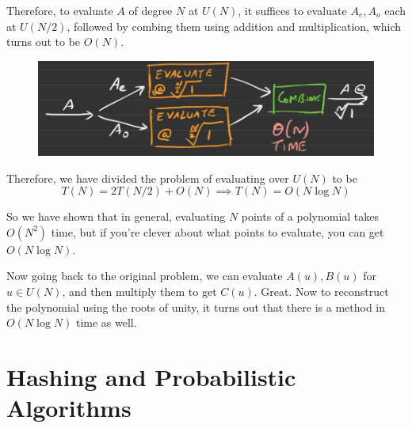 \documentclass{article}
\begin{document}
    Therefore, to evaluate $A$ of degree $N$ at $U(N)$, it suffices to evaluate $A_e, A_o$ each at $U(N/2)$, followed by combing them using addition and multiplication, which turns out to be $O(N)$. 

    \begin{figure}[H]
      \centering 
      \includegraphics[scale=0.4]{img/fft.png}
      \caption{} 
      \label{fig:fft}
    \end{figure}

    \begin{algo}
      
      \begin{algorithm}[H]
        \label{alg:unity}
        \begin{algorithmic}
          \Require{}
          \State 
          \EndFunction
        \end{algorithmic}
      \end{algorithm}
    \end{algo}

    Therefore, we have divided the problem of evaluating over $U(N)$ to be 
    \begin{equation}
      T(N) = 2 T(N/2) + O(N) \implies T(N) = O( N \log{N}) 
    \end{equation}

    So we have shown that in general, evaluating $N$ points of a polynomial takes $O(N^2)$ time, but if you're clever about what points to evaluate, you can get $O(N \log N)$. 

    Now going back to the original problem, we can evaluate $A(u), B(u)$ for $u \in U(N)$, and then multiply them to get $C(u)$. Great. Now to reconstruct the polynomial using the roots of unity, it turns out that there is a method in $O(N \log{N})$ time as well. 

\section{Hashing and Probabilistic Algorithms}
\end{document}
